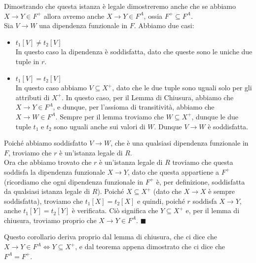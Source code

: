 \documentclass[11pt, a4paper, titlepage, oneside]{scrbook}
\begin{document}
\begin{itemize}
    Dimostrando che questa istanza è legale dimostreremo anche che se abbiamo $X \longrightarrow Y \in F^+$ allora avremo anche $X \longrightarrow Y \in F^A$, ossia $F^+ \subseteq F^A$. \\
    Sia $V \longrightarrow W$ una dipendenza funzionale in $F$. Abbiamo due casi:
    \begin{itemize}
        \item $t_1[V] \neq t_2[V]$ \\
        In questo caso la dipendenza è soddisfatta, dato che queste sono le uniche due tuple in $r$.
        \item $t_1[V] = t_2[V]$ \\
        In questo caso abbiamo $V \subseteq X^+$, dato che le due tuple sono uguali solo per gli attributi di $X^+$. In questo caso, per il Lemma di Chiusura, abbiamo che $X \longrightarrow Y \in F^A$, e dunque, per l'assioma di transitività, abbiamo che $X \longrightarrow W \in F^A$. Sempre per il lemma troviamo che $W \subseteq X^+$, dunque le due tuple $t_1$ e $t_2$ sono uguali anche sui valori di $W$. Dunque $V \longrightarrow W$ è soddisfatta.
    \end{itemize}
    Poiché abbiamo soddisfatto $V \longrightarrow W$, che è una qualsiasi dipendenza funzionale in $F$, troviamo che $r$ è un'istanza legale di $R$. \\
    Ora che abbiamo trovato che $r$ è un'istanza legale di $R$ troviamo che questa soddisfa la dipendenza funzionale $X \longrightarrow Y$, dato che questa appartiene a $F^+$ (ricordiamo che ogni dipendenza funzionale in $F^+$ è, per definizione, soddisfatta da qualsiasi istanza legale di $R$). Poiché $X \subseteq X^+$ (dato che $X \longrightarrow X$ è sempre soddisfatta), troviamo che $t_1[X] = t_2[X]$ e quindi, poiché $r$ soddisfa $X \longrightarrow Y$, anche $t_1[Y] = t_2[Y]$ è verificata. Ciò significa che $Y \subseteq X^+$ e, per il lemma di chiusura, troviamo proprio che $X \longrightarrow Y \in F^A$. $\blacksquare$
\end{itemize}


Questo corollario deriva proprio dal lemma di chiusura, che ci dice che $X \longrightarrow Y \in F^A \iff Y \subseteq X^+$, e dal teorema appena dimostrato che ci dice che $F^A = F^+$.
\end{document}
